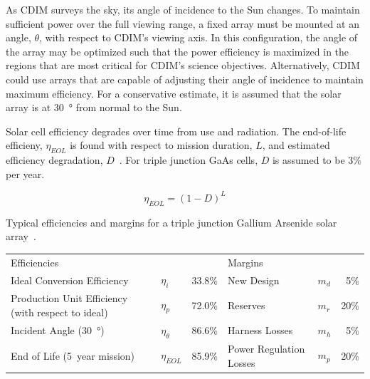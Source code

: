 \documentclass{ws-jai}
\begin{document}
As CDIM surveys the sky, its angle of incidence to the Sun changes.
To maintain sufficient power over the full viewing range, a fixed array must be mounted at an angle, $\theta$, with respect to CDIM's viewing axis.
In this configuration, the angle of the array may be optimized such that the power efficiency is maximized in the regions that are most critical for CDIM's science objectives.
Alternatively, CDIM could use arrays that are capable of adjusting their angle of incidence to maintain maximum efficiency.
For a conservative estimate, it is assumed that the solar array is at \SI{30}{\degree} from normal to the Sun.


Solar cell efficiency degrades over time from use and radiation.
The end-of-life efficieny, $\eta_{EOL}$ is found with respect to mission duration, $L$, and estimated efficiency degradation, $D$~\cite{smad2015}.
For triple junction GaAs cells, $D$ is assumed to be 3\% per year.

\begin{equation}
  \eta_{EOL} = {(1-D)}^L
\end{equation}

\begin{wstable}[!ht]
  \centering
  \caption{Typical efficiencies and margins for a triple junction Gallium Arsenide solar array~\cite{smad2015}.
\label{tab:solar-array}
  }
  \begin{tabular}{@{}llrllr@{}}\toprule
    Efficiencies &&  & Margins & & \\ \cmidrule(r){1-3} \cmidrule(l){4-6}
    Ideal Conversion Efficiency & $\eta_{i}$ & 33.8\% & New Design & $m_d$ & 5\%  \\
    Production Unit Efficiency (with respect to ideal) & $\eta_{p}$  & 72.0\% & Reserves & $m_r$ & 20\% \\
    Incident Angle (\SI{30}{\degree}) & $\eta_{\theta}$ & 86.6\% & Harness Losses & $m_h$ &5\% \\
    End of Life (\SI{5}{year} mission) & $\eta_{EOL}$ & 85.9\% & Power Regulation Losses &  $m_p$ & 20\% \\ \bottomrule
  \end{tabular}
\end{wstable}
\end{document}
